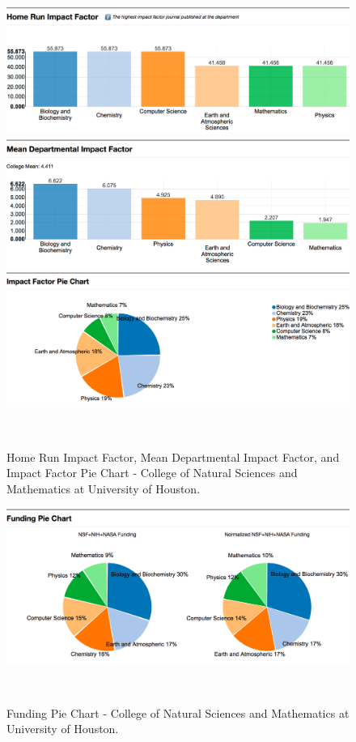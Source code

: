 \begin{figure}
  \centering
  \includegraphics[width=1\textwidth]{figures/Coll-IF-HD}
  \includegraphics[width=1\textwidth]{figures/Coll-IF-HD2}
  \includegraphics[width=1\textwidth]{figures/Coll-IF-HD3}
  \caption{Home Run Impact Factor, Mean Departmental Impact Factor, and Impact Factor Pie Chart - College of Natural Sciences and Mathematics at University of Houston.}~\label{fig:DP-College1}
\end{figure}

\begin{figure}
  \centering
  \includegraphics[width=1\textwidth]{figures/Coll-Fund-HD}
  \caption{Funding Pie Chart - College of Natural Sciences and Mathematics at University of Houston.}~\label{fig:DP-College1}
\end{figure}


